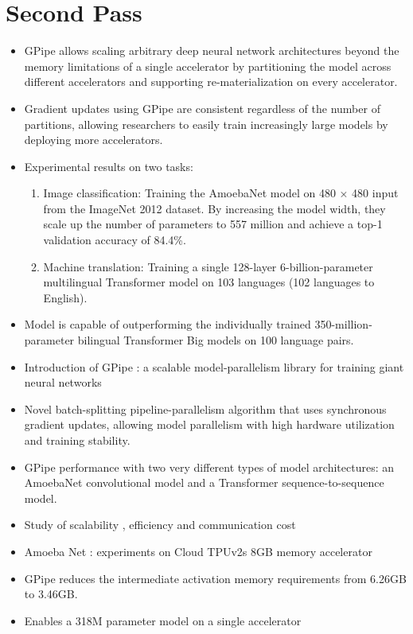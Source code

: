 \documentclass[12pt]{article}
\begin{document}
\section{Second Pass}
\begin{itemize}
  \item GPipe allows scaling arbitrary deep neural network architectures beyond the memory limitations of a single accelerator by partitioning the model across different accelerators and supporting re-materialization on every accelerator.
  \item Gradient updates using GPipe are consistent regardless of the number of partitions, allowing researchers to easily train increasingly large models by deploying more accelerators.
  \item Experimental results on two tasks:
    \begin{enumerate}[label=(\roman*)]
      \item Image classification: Training the AmoebaNet model on 480 × 480 input from the ImageNet 2012 dataset. By increasing the model width, they scale up the number of parameters to 557 million and achieve a top-1 validation accuracy of 84.4\%.
      \item Machine translation: Training a single 128-layer 6-billion-parameter multilingual Transformer model on 103 languages (102 languages to English).
    \end{enumerate}
  \item Model is capable of outperforming the individually trained 350-million-parameter bilingual Transformer Big models on 100 language pairs.
  \item Introduction of GPipe : a scalable model-parallelism library for training giant neural networks
  \item Novel batch-splitting pipeline-parallelism algorithm that uses synchronous gradient updates, allowing model parallelism with high hardware utilization and training stability.
  \item GPipe performance with two very different types of model architectures: an AmoebaNet  convolutional model and a Transformer  sequence-to-sequence model.
  \item Study of scalability , efficiency and communication cost 
  \item Amoeba Net : experiments on Cloud TPUv2s 8GB memory accelerator
  \item GPipe reduces the intermediate activation memory requirements from 6.26GB to 3.46GB.
  \item Enables a 318M parameter model on a single accelerator

\end{itemize}
\end{document}
